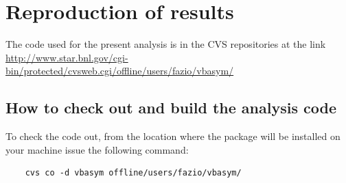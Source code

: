 \documentclass[12pt]{article}
\begin{document}
%


%







\appendix
\section{Reproduction of results}
The code used for the present analysis is in the CVS repositories at the link
\newline \url{http://www.star.bnl.gov/cgi-bin/protected/cvsweb.cgi/offline/users/fazio/vbasym/}

\subsection{How to check out and build the analysis code}
To check the code out, from the location where the package will be
installed on your machine issue the following command:

\begin{lstlisting}
    cvs co -d vbasym offline/users/fazio/vbasym/
\end{lstlisting}
\end{document}
